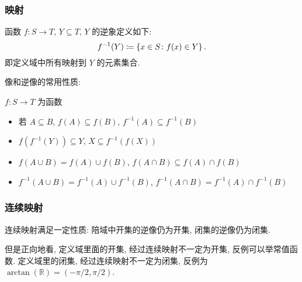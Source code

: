 \documentclass[UTF8]{ctexart}
\theoremstyle{mystyle}
\newcommand{\R}{\mathbb R}
\DeclarePairedDelimiter\set{\lbrace}{\rbrace}
\begin{document}
\subsubsection{映射}
\begin{definition}[\text{逆象}]
    函数 $ f \colon S \to T $, $ Y \subseteq T $, $ Y $ 的逆象定义如下: \[ f^{-1}(Y) \coloneqq \set{x \in S \colon f(x) \in Y} \,.\] 即定义域中所有映射到 $ Y $ 的元素集合.
\end{definition}

像和逆像的常用性质:
\begin{proposition}
    $ f \colon S \to T $ 为函数
    \begin{itemize}
        \item 若 $ A \subseteq B $, $ f(A) \subseteq f(B) $, $ f^{-1}(A) \subseteq f^{-1}(B) $
        \item $ f(f^{-1}(Y)) \subseteq Y $, $ X \subseteq f^{-1}(f(X)) $
        \item $ f(A \cup B) = f(A) \cup f(B) $, $ f(A \cap B) \subseteq f(A) \cap f(B) $
        \item $ f^{-1}(A \cup B) = f^{-1}(A) \cup f^{-1}(B) $, $ f^{-1}(A \cap B) = f^{-1}(A) \cap f^{-1}(B) $
    \end{itemize}
\end{proposition}

\subsubsection{连续映射}
连续映射满足一定性质: 陪域中开集的逆像仍为开集, 闭集的逆像仍为闭集.

但是正向地看, 定义域里面的开集, 经过连续映射不一定为开集, 反例可以举常值函数. 定义域里的闭集, 经过连续映射不一定为闭集, 反例为 $ \arctan(\R) = (-\pi/2, \pi/2) $.
\end{document}
